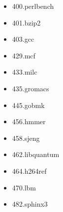 \begin{multicols}{2}
	\begin{itemize}
		\item 400.perlbench
		\item 401.bzip2
		\item 403.gcc
		\item 429.mcf
		\item 433.milc
		\item 435.gromacs
		\item 445.gobmk
		\item 456.hmmer
		\item 458.sjeng
		\item 462.libquantum
		\item 464.h264ref
		\item 470.lbm
		\item 482.sphinx3
	\end{itemize}
\end{multicols}
